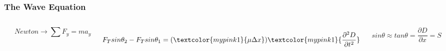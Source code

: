 \documentclass[]{beamer}
\begin{document}


\begin{frame}
\frametitle{The Wave Equation}



   \begin{columns}[c]
   \column{2in}  %
   \begin{center}
  \includegraphics[height=1.in]{images4/10.jpg}
\end{center}






   \column{2.5in}

  
   \begin{equation*}
   Newton \rightarrow \sum F_y=ma_y
    \end{equation*}

 
      
\begin{equation*}
F_Tsin\theta_2-F_Tsin\theta_1=(\textcolor{mypink1}{\mu\Delta x})\textcolor{mypink1}{\frac{\partial^2 D}{\partial t^2}}
\end{equation*}


\pause

\begin{equation*}
 sin\theta\approx tan\theta=\frac{\partial D}{\partial x}=S
\end{equation*}

\end{columns}

\end{frame}







\end{document}
